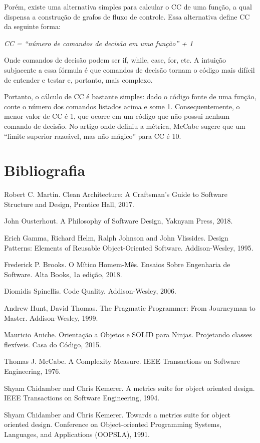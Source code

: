 \documentclass[
  11pt,
  twoside]{book}
\begin{document}
Porém, existe uma alternativa simples para calcular o CC de uma função,
a qual dispensa a construção de grafos de fluxo de controle. Essa
alternativa define CC da seguinte forma:

\emph{CC = ``número de comandos de decisão em uma função'' + 1}

Onde comandos de decisão podem ser if, while, case, for, etc. A intuição
subjacente a essa fórmula é que comandos de decisão tornam o código mais
difícil de entender e testar e, portanto, mais complexo.

Portanto, o cálculo de CC é bastante simples: dado o código fonte de uma
função, conte o número dos comandos listados acima e some 1.
Consequentemente, o menor valor de CC é 1, que ocorre em um código que
não possui nenhum comando de decisão. No artigo onde definiu a métrica,
McCabe sugere que um ``limite superior razoável, mas não mágico'' para
CC é 10.

\hypertarget{bibliografia-4}{%
\section*{Bibliografia}\label{bibliografia-4}}

Robert C. Martin. Clean Architecture: A Craftsman's Guide to Software
Structure and Design, Prentice Hall, 2017.

John Ousterhout. A Philosophy of Software Design, Yaknyam Press, 2018.

Erich Gamma, Richard Helm, Ralph Johnson and John Vlissides. Design
Patterns: Elements of Reusable Object-Oriented Software. Addison-Wesley,
1995.

Frederick P. Brooks. O Mítico Homem-Mês. Ensaios Sobre Engenharia de
Software. Alta Books, 1a edição, 2018.

Diomidis Spinellis. Code Quality. Addison-Wesley, 2006.

Andrew Hunt, David Thomas. The Pragmatic Programmer: From Journeyman to
Master. Addison-Wesley, 1999.

Mauricio Aniche. Orientação a Objetos e SOLID para Ninjas. Projetando
classes flexíveis. Casa do Código, 2015.

Thomas J. McCabe. A Complexity Measure. IEEE Transactions on Software
Engineering, 1976.

Shyam Chidamber and Chris Kemerer. A metrics suite for object oriented
design. IEEE Transactions on Software Engineering, 1994.

Shyam Chidamber and Chris Kemerer. Towards a metrics suite for object
oriented design. Conference on Object-oriented Programming Systems,
Languages, and Applications (OOPSLA), 1991.
\end{document}
